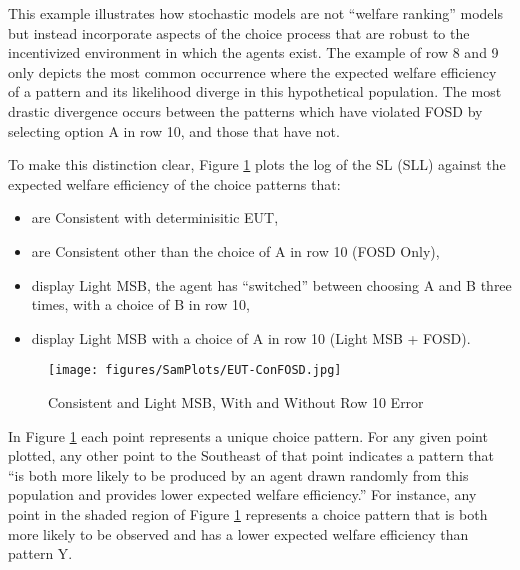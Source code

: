 \documentclass[../main.tex]{subfiles}
\begin{document}
This example illustrates how stochastic models are not \enquote{welfare ranking} models but instead incorporate aspects of the choice process that are robust to the incentivized environment in which the agents exist.
The example of row 8 and 9 only depicts the most common occurrence where the expected welfare efficiency of a pattern and its likelihood diverge in this hypothetical population.
The most drastic divergence occurs between the patterns which have violated FOSD by selecting option A in row 10, and those that have not.

To make this distinction clear, Figure \ref{fig:ConFOSD} plots the log of the SL (SLL) against the expected welfare efficiency of the choice patterns that:
\begin{itemize}
 \setlength\itemsep{-.5em}
	\item are Consistent with determinisitic EUT,
	\item are Consistent other than the choice of A in row 10 (FOSD Only),
	\item display Light MSB, the agent has \enquote{switched} between choosing A and B three times, with a choice of B in row 10,
	\item display Light MSB with a choice of A in row 10 (Light MSB + FOSD).
\end{itemize}

\begin{figure}[h!]
	\caption{Consistent and Light MSB, With and Without Row 10 Error}
	\texttt{[image: figures/SamPlots/EUT-ConFOSD.jpg]}
	\label{fig:ConFOSD}
\end{figure}

In Figure \ref{fig:ConFOSD} each point represents a unique choice pattern.
For any given point plotted, any other point to the Southeast of that point indicates a pattern that \enquote{is both more likely to be produced by an agent drawn randomly from this population and provides lower expected welfare efficiency.}
For instance, any point in the shaded region of Figure \ref{fig:ConFOSD} represents a choice pattern that is both more likely to be observed and has a lower expected welfare efficiency than pattern Y.
\end{document}

